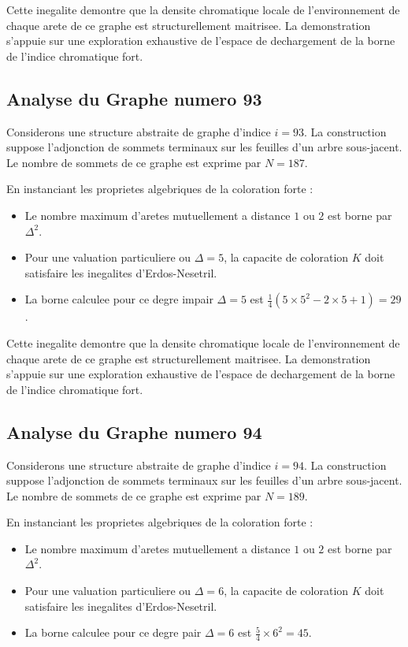\documentclass[11pt,a4paper]{article}
\begin{document}
Cette inegalite demontre que la densite chromatique locale de l'environnement de chaque arete de ce graphe est structurellement maitrisee. La demonstration s'appuie sur une exploration exhaustive de l'espace de dechargement de la borne de l'indice chromatique fort.

\subsection{Analyse du Graphe numero 93}
Considerons une structure abstraite de graphe d'indice $i = 93$. La construction suppose l'adjonction de sommets terminaux sur les feuilles d'un arbre sous-jacent. Le nombre de sommets de ce graphe est exprime par $N = 187$.

En instanciant les proprietes algebriques de la coloration forte :
\begin{itemize}
\item Le nombre maximum d'aretes mutuellement a distance $1$ ou $2$ est borne par $\Delta^2$.
\item Pour une valuation particuliere ou $\Delta = 5$, la capacite de coloration $K$ doit satisfaire les inegalites d'Erdos-Nesetril.
\item La borne calculee pour ce degre impair $\Delta = 5$ est $\frac{1}{4}(5 \times 5^2 - 2 \times 5 + 1) = 29$.
\end{itemize}

Cette inegalite demontre que la densite chromatique locale de l'environnement de chaque arete de ce graphe est structurellement maitrisee. La demonstration s'appuie sur une exploration exhaustive de l'espace de dechargement de la borne de l'indice chromatique fort.

\subsection{Analyse du Graphe numero 94}
Considerons une structure abstraite de graphe d'indice $i = 94$. La construction suppose l'adjonction de sommets terminaux sur les feuilles d'un arbre sous-jacent. Le nombre de sommets de ce graphe est exprime par $N = 189$.

En instanciant les proprietes algebriques de la coloration forte :
\begin{itemize}
\item Le nombre maximum d'aretes mutuellement a distance $1$ ou $2$ est borne par $\Delta^2$.
\item Pour une valuation particuliere ou $\Delta = 6$, la capacite de coloration $K$ doit satisfaire les inegalites d'Erdos-Nesetril.
\item La borne calculee pour ce degre pair $\Delta = 6$ est $\frac{5}{4} \times 6^2 = 45$.
\end{itemize}
\end{document}
